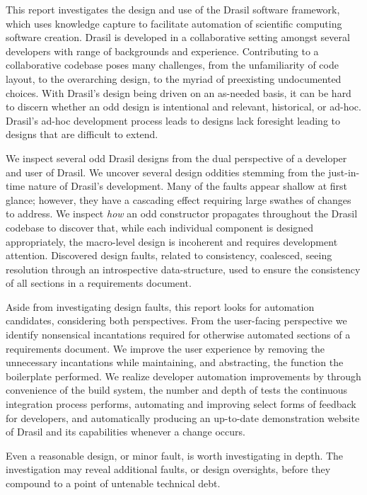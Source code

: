 \label{execSum}

This report investigates the design and use of the Drasil software framework, which uses knowledge capture to facilitate automation of scientific computing software creation. Drasil is developed in a collaborative setting amongst several developers with range of backgrounds and experience. Contributing to a collaborative codebase poses many challenges, from the unfamiliarity of code layout, to the overarching design, to the myriad of preexisting undocumented choices. With Drasil's design being driven on an as-needed basis, it can be hard to discern whether an odd design is intentional and relevant, historical, or ad-hoc. Drasil's ad-hoc development process leads to designs lack foresight leading to designs that are difficult to extend.

We inspect several odd Drasil designs from the dual perspective of a developer and user of Drasil. We uncover several design oddities stemming from the just-in-time nature of Drasil's development. Many of the faults appear shallow at first glance; however, they have a cascading effect requiring large swathes of changes to address. We inspect \textit{how} an odd constructor propagates throughout the Drasil codebase to discover that, while each individual component is designed appropriately, the macro-level design is incoherent and requires development attention. Discovered design faults, related to consistency, coalesced, seeing resolution through an introspective data-structure, used to ensure the consistency of all sections in a requirements document.

Aside from investigating design faults, this report looks for automation candidates, considering both perspectives. From the user-facing perspective we identify nonsensical incantations required for otherwise automated sections of a requirements document. We improve the user experience by removing the unnecessary incantations while maintaining, and abstracting, the function the boilerplate performed. We realize developer automation improvements by through convenience of the build system, the number and depth of tests the continuous integration process performs, automating and improving select forms of feedback for developers, and automatically producing an up-to-date demonstration website of Drasil and its capabilities whenever a change occurs.

Even a reasonable design, or minor fault, is worth investigating in depth. The investigation may reveal additional faults, or design oversights, before they compound to a point of untenable technical debt.